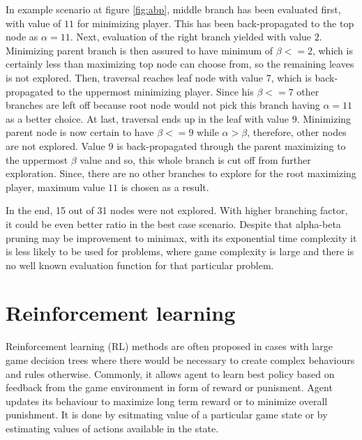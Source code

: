In example scenario at figure \ref{fig:abp}, middle branch has been evaluated
first, with value of $11$ for minimizing player. This has been back-propagated
to the top node as $\alpha{=}11$. Next, evaluation of the right branch yielded
with value $2$. Minimizing parent branch is then assured to have minimum
of $\beta{<=}2$, which is certainly less than maximizing top node can choose
from, so the remaining leaves is not explored. Then, traversal reaches leaf node
with value 7, which is back-propagated to the uppermost minimizing player.
Since his $\beta{<=}7$ other branches are left off because root node would not
pick this branch having $\alpha=11$ as a better choice. At last, traversal ends up
in the leaf with value $9$. Minimizing parent node is now certain to have
$\beta{<=}9$ while $\alpha{>}\beta$, therefore, other nodes are not explored.
Value $9$ is back-propagated through the parent maximizing to the uppermost
$\beta$ value and so, this whole branch is cut off from further exploration.
Since, there are no other branches to explore for the root maximizing player,
maximum value $11$ is chosen as a result.

In the end, 15 out of 31 nodes were not explored. With higher branching factor,
it could be even better ratio in the best case scenario. Despite that
alpha-beta pruning may be improvement to minimax, with its exponential
time complexity it is less likely to be used for problems, where game
complexity is large and there is no well known evaluation function for that
particular problem.


\section{Reinforcement learning}
Reinforcement learning (RL) methods are often proposed in cases with large game
decision trees where there would be necessary to create complex behaviours and
rules otherwise.
Commonly, it allows agent to learn best policy based on feedback from the game
environment in form of reward or punisment. Agent updates its behaviour to
maximize long term reward or to minimize overall punishment. It is done by
esitmating value of a particular game state or by estimating values of actions
available in the state.


